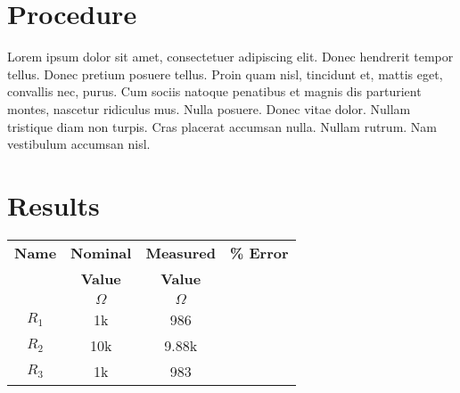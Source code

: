 \documentclass{article}
\begin{document}
\section{Procedure}
\label{sec:procedure}


Lorem ipsum dolor sit amet, consectetuer adipiscing elit. Donec
hendrerit tempor tellus. Donec pretium posuere tellus. Proin quam
nisl, tincidunt et, mattis eget, convallis nec, purus. Cum sociis
natoque penatibus et magnis dis parturient montes, nascetur ridiculus
mus. Nulla posuere. Donec vitae dolor. Nullam tristique diam non
turpis. Cras placerat accumsan nulla. Nullam rutrum. Nam vestibulum
accumsan nisl.

\section{Results}

\begin{table}[h]
  \centering
  \begin{tabular}{*{4}{c}}
    \textbf{Name} & \textbf{Nominal} & \textbf{Measured} & \textbf{\% Error} \\
    & \textbf{Value} & \textbf{Value} \\
    & $\Omega$ & $\Omega$ & \\
    \hline
    $R_1$ & 1k & 986 & \\
    $R_2$ & 10k & 9.88k \\
    $R_3$ & 1k & 983 \\
  \end{tabular}
  \label{tab:table_01}
\end{table}

\end{document}
